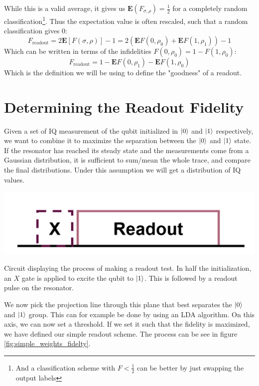 While this is a valid average, it gives us $\mathbf{E}(F_{\sigma, \rho}) = \frac12$ for a completely random classification\footnote{And a classification scheme with $F<\frac12$ can be better by just swapping the output labels}. Thus the expectation value is often rescaled, such that a random classification gives $0$:
\begin{equation}
    F_{\text{readout}} = 2 \mathbf{E}\left[F(\sigma, \rho)\right] - 1 = 2 ( \mathbf{E}F(0, \rho_0) + \mathbf{E}F(1, \rho_1) ) - 1 
\end{equation}
Which can be written in terms of the infidelities $F(0, \rho_0) = 1 - F(1, \rho_0)$:
\begin{equation}
    F_{\text{readout}} = 1 - \mathbf{E}F(0, \rho_1) - \mathbf{E}F(1, \rho_0)
\end{equation}
Which is the definition we will be using to define the "goodness" of a readout. 

\section{Determining the Readout Fidelity}
Given a set of IQ measurement of the qubit initialized in $\ket{0}$ and $\ket{1}$ respectively, we want to combine it to maximize the separation between the $\ket{0}$ and $\ket{1}$ state. If the resonator has reached its steady state and the measurements come from a Gaussian distribution, it is sufficient to sum/mean the whole trace, and compare the final distributions. Under this assumption we will get a distribution of IQ values. 

\begin{marginfigure}
    \centering
    \includegraphics[]{Figs/circuits/readout_test.png}
    \caption{Circuit displaying the process of making a readout test. In half the initialization, an $X$ gate is applied to excite the qubit to $\ket{1}$. This is followed by a readout pulse on the resonator.}
    \label{fig:circuit_qubit_readout_test}
\end{marginfigure}

We now pick the projection line through this plane that best separates the $\ket{0}$ and $\ket{1}$ group. This can for example be done by using an LDA algorithm. On this axis, we can now set a threshold. If we set it such that the fidelity is maximized, we have defined our simple readout scheme. The process can be see in figure \ref{fig:simple_weights_fidelty}.

